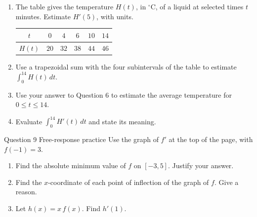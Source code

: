 \documentclass[11pt]{article}
\begin{document}
\begin{enumerate}[leftmargin=*,itemsep=2pt,start=5]
  \item The table gives the temperature $H(t)$, in $^\circ$C, of a liquid at selected times $t$ minutes. Estimate $H'(5)$, with units.\begin{center}\renewcommand{\arraystretch}{1.25}\begin{tabular}{|c|c|c|c|c|c|}\hline $t$ & $0$ & $4$ & $6$ & $10$ & $14$ \\ \hline $H(t)$ & $20$ & $32$ & $38$ & $44$ & $46$ \\ \hline\end{tabular}\end{center}\work{2.1cm}
  \item Use a trapezoidal sum with the four subintervals of the table to estimate $\displaystyle\int_{0}^{14}H(t)\,dt$.\work{2.1cm}
  \item Use your answer to Question 6 to estimate the average temperature for $0\le t\le14$.\work{2.1cm}
  \item Evaluate $\displaystyle\int_{0}^{14}H'(t)\,dt$ and state its meaning.\work{2.1cm}
\end{enumerate}

\begin{frbox}{Question 9 \textperiodcentered{} Free-response practice}
Use the graph of $f'$ at the top of the page, with $f(-1)=3$.
\begin{enumerate}[label=(\alph*),leftmargin=*,itemsep=2pt]
  \item Find the absolute minimum value of $f$ on $[-3,5]$. Justify your answer.\work{1.9cm}
  \item Find the $x$-coordinate of each point of inflection of the graph of $f$. Give a reason.\work{1.9cm}
  \item Let $h(x)=x\,f(x)$. Find $h'(1)$.\work{1.9cm}
\end{enumerate}
\end{frbox}
\end{document}
